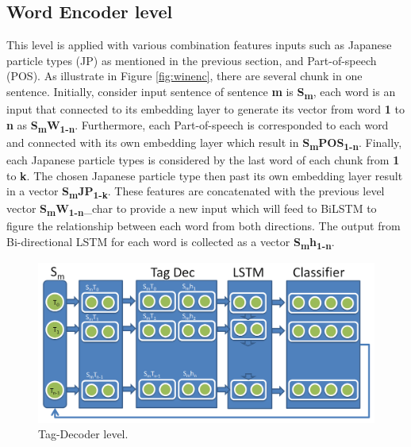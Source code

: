 \begin{CJK*}{UTF8}{min}
\subsection{Word Encoder level}
This level is applied with various combination features inputs such as Japanese particle types (JP) as mentioned in the previous section, and Part-of-speech (POS).
As illustrate in Figure \ref{fig:winenc}, there are several chunk in one sentence.
Initially, consider input sentence of sentence \textbf{m} is \textbf{S\textsubscript{m}}, each word is an input that connected to its embedding layer to generate its vector from word \textbf{1} to \textbf{n} as \textbf{S\textsubscript{m}W\textsubscript{1-n}}.
Furthermore, each Part-of-speech is corresponded to each word and connected with its own embedding layer which result in \textbf{S\textsubscript{m}POS\textsubscript{1-n}}.
Finally, each Japanese particle types is considered by the last word of each chunk from \textbf{1} to \textbf{k}.
The chosen Japanese particle type then past its own embedding layer result in a vector \textbf{S\textsubscript{m}JP\textsubscript{1-k}}.
These features are concatenated with the previous level vector \textbf{S\textsubscript{m}W\textsubscript{1-n}}\_char to provide a new input which will feed to BiLSTM to figure the relationship between each word from both directions.
The output from Bi-directional LSTM for each word is collected as a vector \textbf{S\textsubscript{m}h\textsubscript{1-n}}.



\begin{figure}[!h]
  \includegraphics[scale=0.3]{tag_decoder.png}
  \caption{Tag-Decoder level.} 

  \label{fig:tagdec}
\end{figure}


\end{CJK*}
